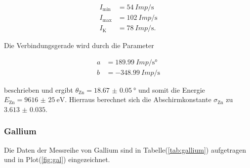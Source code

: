             \begin{align*}
                I_{\text{min}} &= \SI{54}{Imp\per\second}\\
                I_{\text{max}} &= \SI{102}{Imp\per\second}\\
                I_{\text{K}} &= \SI{78}{Imp\per\second} .
            \end{align*}

            \noindent Die Verbindungsgerade wird durch die Parameter 

            \begin{align*}
                a & = \SI{189.99}{Imp\per\second\degree}\\
                b & = \SI{-348.99}{Imp\per\second}
            \end{align*}

            \noindent beschrieben und ergibt $\theta_{\text{Zn}} = \SI{18.67(5)}{\degree}$ und somit die Energie $E_{\text{Zn}} = \SI{9616(25)}{\electronvolt}$. 
            Hierraus berechnet sich die Abschirmkonstante $\sigma_{\text{Zn}}$ zu $ \num{3.613(35)}$.

        \subsubsection{Gallium}
            
            \noindent Die Daten der Messreihe von Gallium sind in Tabelle(\ref{tab:gallium}) aufgetragen und in Plot(\ref{fig:gal}) eingezeichnet.

